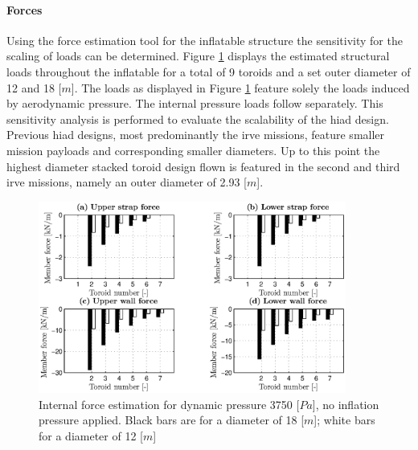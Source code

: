 \paragraph{Forces}

Using the force estimation tool for the inflatable structure the sensitivity for the scaling of loads can be determined. Figure \ref{fig:forces} displays the estimated structural loads throughout the inflatable for a total of 9 toroids and a set outer diameter of 12 and 18 [$m$]. The loads as displayed in Figure \ref{fig:forces} feature solely the loads induced by aerodynamic pressure. The internal pressure loads follow separately. This sensitivity analysis is performed to evaluate the scalability of the \gls{hiad} design. Previous \gls{hiad} designs, most predominantly the \gls{irve} missions, feature smaller mission payloads and corresponding smaller diameters. Up to this point the highest diameter stacked toroid design flown is featured in the second and third \gls{irve} missions, namely an outer diameter of 2.93 [$m$]. 

\begin{figure}[h]
	\centering
	\includegraphics[width=0.9\textwidth]{./Figure/Structure/forces_nopress_test.eps}
	\caption[{Internal force estimation for dynamic pressure 3750 [$Pa$], no inflation pressure applied}]{Internal force estimation for dynamic pressure 3750 [$Pa$], no inflation pressure applied. Black bars are for a diameter of 18 [$m$]; white bars for a diameter of 12 [$m$]}
	\label{fig:forces}
\end{figure}

